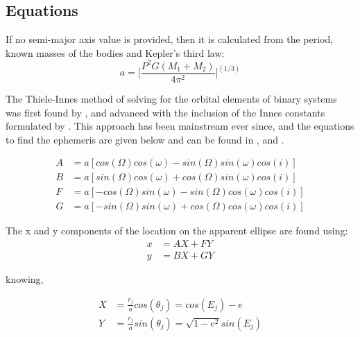 \documentclass[10pt,preprint]{aastex}
\begin{document}
\subsection{Equations}

If no semi-major axis value is provided, then it is calculated from the period, known masses of the bodies and Kepler's third law:
\begin{equation}\label{eq:28}
a = \bigg[\frac{P^2G(M_1+M_2)}{4\pi^2} \bigg]^{(1/3)}
\end{equation}

The Thiele-Innes method of solving for the orbital elements of binary systems was first found by \citet{Thiele}, and advanced with the inclusion of the Innes constants formulated by \citet{Van}.  This approach has been mainstream ever since, and the equations to find the ephemeris are given below and can be found in \citet{aitken}, \citet{binnendijk} and \citet{heintz}.



\begin{subequations}
\begin{align}\label{eq:24a}
A& = a[cos(\Omega)cos(\omega)-sin(\Omega)sin(\omega)cos(i)]\\
\label{eq:24b}
B& = a[sin(\Omega)cos(\omega)+cos(\Omega)sin(\omega)cos(i)]\\
\label{eq:24c}
F& = a[-cos(\Omega)sin(\omega)-sin(\Omega)cos(\omega)cos(i)]\\
\label{eq:24d}
G& = a[-sin(\Omega)sin(\omega)+cos(\Omega)cos(\omega)cos(i)]
\end{align}
\end{subequations}



The x and y components of the location on the apparent ellipse are found using:
\begin{subequations}
\begin{align}\label{eq:28-1a}
x& = AX+FY\\
\label{eq:28-1b}
y& = BX + GY
\end{align}
\end{subequations}

knowing,

\begin{subequations}
\begin{align}\label{eq:28-1.5a}
X& = \frac{r_j}{a}cos(\theta_j) = cos(E_j)-e\\
\label{eq:28-1.5b}
Y& = \frac{r_j}{a}sin(\theta_j) = \sqrt{1-e^2}sin(E_j) 
\end{align}
\end{subequations}
\end{document}
